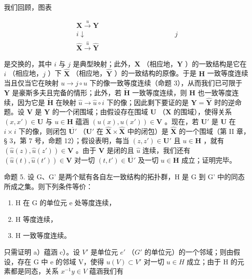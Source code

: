 我们回顾，图表

\[
\begin{array}{c} \mathbf {X} \xrightarrow {u} \mathbf {Y} \\ i \downarrow \quad \quad \quad \quad \quad \quad \quad \quad \quad \quad \quad \quad \quad j \\ \hat {\mathbf {X}} \xrightarrow {\hat {u}} \hat {\mathbf {Y}} \end{array}\tag{1}
\]

是交换的，其中 \(i\) 与 \(j\) 是典型映射；此外，\(\mathbf{X}\) （相应地，\(\mathbf{Y}\) ）的一致结构是它在 \(i\) （相应地，\(j\) ）下 \(\hat{\mathbf{X}}\) （相应地，\(\hat{\mathbf{Y}}\) ）的一致结构的原像。于是 \(\mathbf{H}\) 一致等度连续当且仅当它在映射 \(u \to j \circ u\) 下的像一致等度连续（命题 3），从而我们已可限于 \(\mathbf{Y}\) 是豪斯多夫且完备的情形；此外，若 \(\tilde{\mathbf{H}}\) 一致等度连续，则 \(\mathbf{H}\) 也一致等度连续，因为它是 \(\tilde{\mathbf{H}}\) 在映射 \(\hat{u} \to \hat{u} \circ i\) 下的像；因此剩下要证的是 \(\mathbf{Y} = \hat{\mathbf{Y}}\) 时的逆命题。设 \(\mathbf{V}\) 是 \(\mathbf{Y}\) 的一个闭围域；由假设存在围域 \(\mathbf{U}\) （\(\mathbf{X}\) 的围域），使得关系 \((x, x') \in \mathbf{U}\) 与 \(u \in \mathbf{H}\) 蕴涵 \((u(x), u(x')) \in \mathbf{V}\) 。现在，若 \(\mathbf{U}'\) 是 \(\mathbf{U}\) 在 \(i \times i\) 下的像，则闭包 \(\overline{\mathbf{U}'}\) （\(\mathbf{U}'\) 在 \(\hat{\mathbf{X}} \times \hat{\mathbf{X}}\) 中的闭包）是 \(\hat{\mathbf{X}}\) 的一个围域（第 II 章，§ 3，第 7 号，命题 12）；假设表明，每当 \((z, z') \in \mathbf{U}'\) 且 \(u \in \mathbf{H}\) ，就有 \((\hat{u}(z), \hat{u}(z')) \in \mathbf{V}\) 。由于 \(\mathbf{V}\) 是闭的且 \(\hat{u}\) 连续，我们还有 \((\hat{u}(t), \hat{u}(t')) \in \mathbf{V}\) 对一切 \((t, t') \in \overline{\mathbf{U}'}\) 及一切 \(u \in \mathbf{H}\) 成立；证明完毕。

命题 5. 设 G、G' 是两个赋有各自左一致结构的拓扑群，H 是 G 到 G' 中的同态所成之集。则下列条件等价：

\begin{enumerate}
\def\labelenumi{\alph{enumi})}
\item
  H 在 G 的单位元 e 处等度连续，
\item
  H 等度连续，
\item
  H 一致等度连续。
\end{enumerate}

只需证明 a）蕴涵 c）。设 \(V'\) 是单位元 \(e'\) （\(G'\) 的单位元）的一个邻域；则由假设，存在 G 中 e 的邻域 V，使得 \(u(V) \subset V'\) 对一切 \(u \in H\) 成立；由于 H 的元素都是同态，关系 \(x^{-1}y \in V\) 蕴涵我们有

